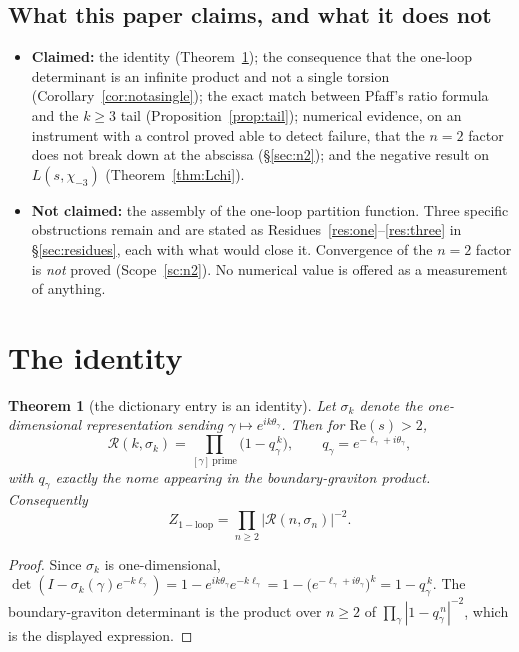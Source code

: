 \documentclass[11pt,a4paper]{article}
\newtheorem{theorem}{Theorem}[section]
\theoremstyle{definition}
\theoremstyle{remark}
\newcommand{\Rz}{\mathcal{R}}
\begin{document}
\subsection{What this paper claims, and what it does not}

\begin{itemize}[leftmargin=1.4em]
\item \textbf{Claimed:} the identity (Theorem~\ref{thm:identity}); the consequence that the
      one-loop determinant is an infinite product and not a single torsion
      (Corollary~\ref{cor:notasingle}); the exact match between Pfaff's ratio formula and the
      $k\ge3$ tail (Proposition~\ref{prop:tail}); numerical evidence, on an instrument with a
      control proved able to detect failure, that the $n=2$ factor does not break down at the
      abscissa (\S\ref{sec:n2}); and the negative result on $L(s,\chi_{-3})$
      (Theorem~\ref{thm:Lchi}).
\item \textbf{Not claimed:} the assembly of the one-loop partition function. Three specific
      obstructions remain and are stated as Residues~\ref{res:one}--\ref{res:three} in
      \S\ref{sec:residues}, each with what would close it. Convergence of the $n=2$ factor is
      \emph{not} proved (Scope~\ref{sc:n2}). No numerical value is offered as a measurement of
      anything.
\end{itemize}

\section{The identity}\label{sec:identity}

\begin{theorem}[the dictionary entry is an identity]\label{thm:identity}
Let $\sigma_k$ denote the one-dimensional representation sending $\gamma\mapsto
e^{ik\theta_\gamma}$. Then for $\mathrm{Re}(s)>2$,
\[
   \Rz(k,\sigma_k)=\prod_{[\gamma]\ \mathrm{prime}}\bigl(1-q_\gamma^{\,k}\bigr),
   \qquad q_\gamma=e^{-\ell_\gamma+i\theta_\gamma},
\]
with $q_\gamma$ exactly the nome appearing in the boundary-graviton product. Consequently
\[
   Z_{\mathrm{1-loop}}=\prod_{n\ge2}\bigl|\Rz(n,\sigma_n)\bigr|^{-2}.
\]
\end{theorem}

\begin{proof}
Since $\sigma_k$ is one-dimensional, $\det(I-\sigma_k(\gamma)e^{-k\ell_\gamma})
=1-e^{ik\theta_\gamma}e^{-k\ell_\gamma}=1-\bigl(e^{-\ell_\gamma+i\theta_\gamma}\bigr)^k
=1-q_\gamma^{\,k}$. The boundary-graviton determinant is the product over $n\ge2$ of
$\prod_\gamma|1-q_\gamma^{\,n}|^{-2}$, which is the displayed expression.
\end{proof}
\end{document}
